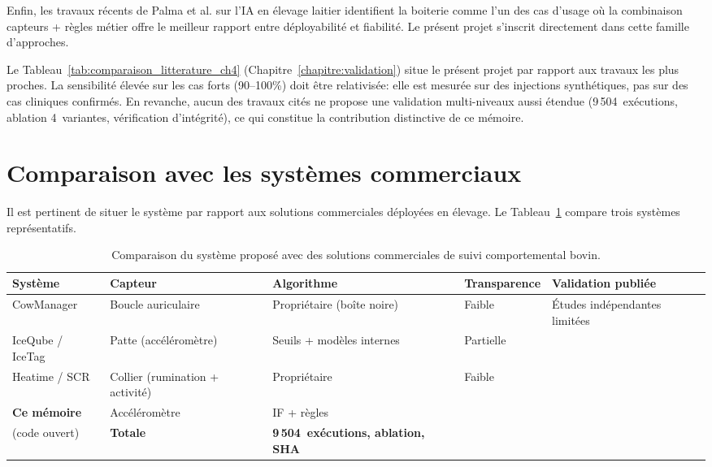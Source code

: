 Enfin, les travaux récents de Palma et al. \citep{palma2025scoping} sur l'IA en élevage
laitier identifient la boiterie comme l'un des cas d'usage où la combinaison capteurs +
règles métier offre le meilleur rapport entre déployabilité et fiabilité. Le présent
projet s'inscrit directement dans cette famille d'approches.

Le Tableau~\ref{tab:comparaison_litterature_ch4} (Chapitre~\ref{chapitre:validation})
situe le présent projet par rapport aux travaux les plus proches. La sensibilité élevée sur
les cas forts (90--100\%) doit être relativisée: elle est mesurée sur des injections
synthétiques, pas sur des cas cliniques confirmés. En revanche, aucun des travaux cités ne
propose une validation multi-niveaux aussi étendue (9\,504~exécutions, ablation 4~variantes,
vérification d'intégrité), ce qui constitue la contribution distinctive de ce mémoire.

\FloatBarrier
\section{Comparaison avec les systèmes commerciaux}

Il est pertinent de situer le système par rapport aux solutions commerciales déployées en
élevage. Le Tableau~\ref{tab:systemes_commerciaux} compare trois systèmes représentatifs.

\begin{table}[H]
    \centering
    \small
    \caption{Comparaison du système proposé avec des solutions commerciales de suivi
    comportemental bovin.}
    \label{tab:systemes_commerciaux}
    \begin{tabular}{>{\raggedright\arraybackslash}p{2cm}
                    >{\raggedright\arraybackslash}p{2.2cm}
                    >{\raggedright\arraybackslash}p{2.0cm}
                    >{\raggedright\arraybackslash}p{2.1cm}
                    >{\raggedright\arraybackslash}p{2.2cm}}
        \toprule
        \textbf{Système} & \textbf{Capteur} & \textbf{Algorithme}
        & \textbf{Transparence} & \textbf{Validation publiée} \\
        \midrule
        CowManager
        & Boucle auriculaire
        & Propriétaire (boîte noire)
        & Faible
        & Études indépendantes limitées \\
        \addlinespace
        IceQube / IceTag
        & Patte (accéléromètre)
        & Seuils + modèles internes
        & Partielle
        & \cite{beer2016objective} \\
        \addlinespace
        Heatime / SCR
        & Collier (rumination + activité)
        & Propriétaire
        & Faible
        & \cite{stangaferro2016use} \\
        \addlinespace
        \textbf{Ce mémoire}
        & Accéléromètre
        & IF + règles\\(code ouvert)
        & \textbf{Totale}
        & \textbf{9\,504~exécutions, ablation, SHA} \\
        \bottomrule
    \end{tabular}
\end{table}

